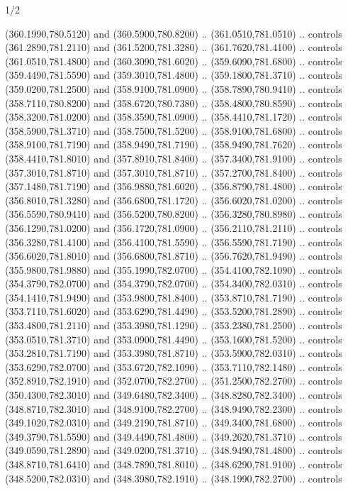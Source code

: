 \begin{flagdescription}{1/2}
\begin{scope}[xshift=0.5\flaglength]
\begin{scope}[scale=0.00745\flagwidth,xshift=-12.1mm,yshift=41.7mm]
\begin{scope}[y=0.80pt, x=0.80pt, yscale=-1, xscale=1, inner sep=0pt, outer sep=0pt]
\begin{scope}[cm={{1.33333,0.0,0.0,-1.33333,(0.0,114.66667)}}]
\begin{scope}[scale=0.100]
  (360.1990,780.5120) and (360.5900,780.8200) .. (361.0510,781.0510) .. controls
  (361.2890,781.2110) and (361.5200,781.3280) .. (361.7620,781.4100) .. controls
  (361.0510,781.4800) and (360.3090,781.6020) .. (359.6090,781.6800) .. controls
  (359.4490,781.5590) and (359.3010,781.4800) .. (359.1800,781.3710) .. controls
  (359.0200,781.2500) and (358.9100,781.0900) .. (358.7890,780.9410) .. controls
  (358.7110,780.8200) and (358.6720,780.7380) .. (358.4800,780.8590) .. controls
  (358.3200,781.0200) and (358.3590,781.0900) .. (358.4410,781.1720) .. controls
  (358.5900,781.3710) and (358.7500,781.5200) .. (358.9100,781.6800) .. controls
  (358.9100,781.7190) and (358.9490,781.7190) .. (358.9490,781.7620) .. controls
  (358.4410,781.8010) and (357.8910,781.8400) .. (357.3400,781.9100) .. controls
  (357.3010,781.8710) and (357.3010,781.8710) .. (357.2700,781.8400) .. controls
  (357.1480,781.7190) and (356.9880,781.6020) .. (356.8790,781.4800) .. controls
  (356.8010,781.3280) and (356.6800,781.1720) .. (356.6020,781.0200) .. controls
  (356.5590,780.9410) and (356.5200,780.8200) .. (356.3280,780.8980) .. controls
  (356.1290,781.0200) and (356.1720,781.0900) .. (356.2110,781.2110) .. controls
  (356.3280,781.4100) and (356.4100,781.5590) .. (356.5590,781.7190) .. controls
  (356.6020,781.8010) and (356.6800,781.8710) .. (356.7620,781.9490) .. controls
  (355.9800,781.9880) and (355.1990,782.0700) .. (354.4100,782.1090) .. controls
  (354.3790,782.0700) and (354.3790,782.0700) .. (354.3400,782.0310) .. controls
  (354.1410,781.9490) and (353.9800,781.8400) .. (353.8710,781.7190) .. controls
  (353.7110,781.6020) and (353.6290,781.4490) .. (353.5200,781.2890) .. controls
  (353.4800,781.2110) and (353.3980,781.1290) .. (353.2380,781.2500) .. controls
  (353.0510,781.3710) and (353.0900,781.4490) .. (353.1600,781.5200) .. controls
  (353.2810,781.7190) and (353.3980,781.8710) .. (353.5900,782.0310) .. controls
  (353.6290,782.0700) and (353.6720,782.1090) .. (353.7110,782.1480) .. controls
  (352.8910,782.1910) and (352.0700,782.2700) .. (351.2500,782.2700) .. controls
  (350.4300,782.3010) and (349.6480,782.3400) .. (348.8280,782.3400) .. controls
  (348.8710,782.3010) and (348.9100,782.2700) .. (348.9490,782.2300) .. controls
  (349.1020,782.0310) and (349.2190,781.8710) .. (349.3400,781.6800) .. controls
  (349.3790,781.5590) and (349.4490,781.4800) .. (349.2620,781.3710) .. controls
  (349.0590,781.2890) and (349.0200,781.3710) .. (348.9490,781.4800) .. controls
  (348.8710,781.6410) and (348.7890,781.8010) .. (348.6290,781.9100) .. controls
  (348.5200,782.0310) and (348.3980,782.1910) .. (348.1990,782.2700) .. controls

\end{scope}
\end{scope}
\end{scope}
\end{scope}
\end{scope}
\end{flagdescription}
